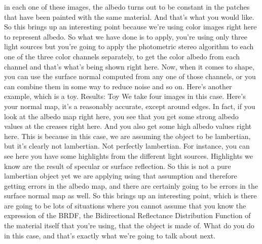 \documentclass[12pt]{article}
\begin{document}
in each one of these images, the albedo turns out
to be constant in the patches that have been
painted with the same material.
And that's what you would like.
So this brings up an interesting point
because we're using color images right here to represent albedo.
So what we have done is to apply,
you're using only three light sources
but you're going to apply the photometric stereo algorithm
to each one of the three color channels
separately, to get the color albedo from each channel
and that's what's being shown right here.
Now, when it comes to shape, you can use the surface normal
computed from any one of those channels,
or you can combine them in some way to reduce noise and so on.
Here's another example, which is a toy.
Results: Toy
We take four images in this case.
Here's your normal map, it's a reasonably accurate,
except around edges.
In fact, if you look at the albedo map right here,
you see that you get some strong albedo values at the creases
right here.
And you also get some high albedo values right here.
This is because in this case, we are assuming the object
to be lambertian, but it's clearly not lambertian.
Not perfectly lambertian.
For instance, you can see here you
have some highlights from the different light sources.
Highlights we know are the result of specular or surface
reflection.
So this is not a pure lambertian object
yet we are applying using that assumption
and therefore getting errors in the albedo map,
and there are certainly going to be errors in the surface
normal map as well.
So this brings up an interesting point,
which is there are going to be lots of situations where you
cannot assume that you know the expression of the BRDF,
the Bidirectional Reflectance Distribution Function
of the material itself that you're using,
that the object is made of.
What do you do in this case, and that's
exactly what we're going to talk about next.
\end{document}
